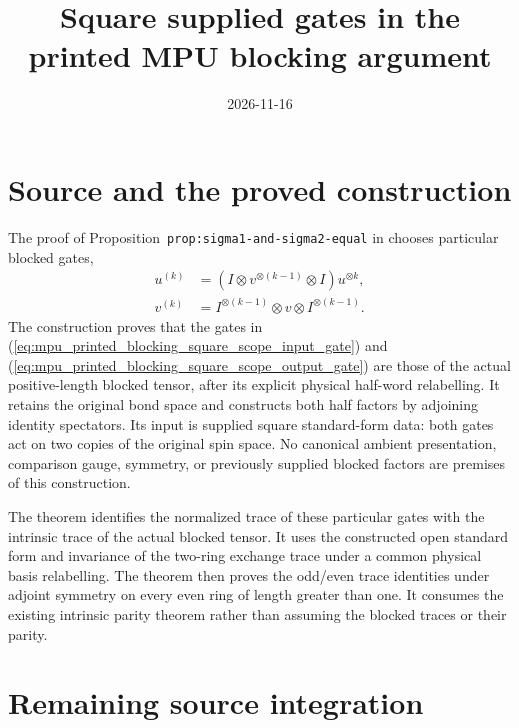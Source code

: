 \documentclass{article}
\title{Square supplied gates in the printed MPU blocking argument}
\author{}
\date{2026-11-16}
\begin{document}
\maketitle
{}

\section{Source and the proved construction}

The proof of Proposition~\texttt{prop:sigma1-and-sigma2-equal} in
\cite[lines~1643--1733]{Cirac2017MPU} chooses particular blocked gates,
\begin{align}
    u^{(k)} & = (I\otimes v^{\otimes(k-1)}\otimes I)u^{\otimes k},
    \label{eq:mpu_printed_blocking_square_scope_input_gate}        \\
    v^{(k)} & = I^{\otimes(k-1)}\otimes v\otimes I^{\otimes(k-1)}.
    \label{eq:mpu_printed_blocking_square_scope_output_gate}
\end{align}
The construction
 proves that the gates in
(\ref{eq:mpu_printed_blocking_square_scope_input_gate}) and
(\ref{eq:mpu_printed_blocking_square_scope_output_gate}) are those of the
actual positive-length blocked tensor, after its
explicit physical half-word relabelling. It retains the original bond
space and constructs both half factors by adjoining identity spectators.
Its input is supplied square standard-form data: both gates act on two
copies of the original spin space. No canonical ambient presentation,
comparison gauge, symmetry, or previously supplied blocked factors are
premises of this construction.

The theorem
identifies the normalized trace of these particular gates with the intrinsic
trace of the actual blocked tensor. It uses the constructed open standard
form and invariance of the two-ring exchange trace under a common physical
basis relabelling.
The theorem
then proves the odd/even trace identities under adjoint symmetry on every
even ring of length greater than one. It consumes the existing intrinsic
parity theorem rather than assuming the blocked traces or their parity.

\section{Remaining source integration}
\end{document}
